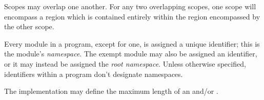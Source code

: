 \specsubitem
Scopes may overlap one another. For any two overlapping scopes, one scope will
encompass a region which is contained entirely within the region encompassed by
the other scope.

\specsubitem
Every module in a program, except for one, is assigned a unique identifier; this
is the module's \textit{namespace}. The exempt module may also be assigned an
identifier, or it may instead be assigned the \textit{root namespace}. Unless
otherwise specified, identifiers within a program don't designate namespaces.

\specsubitem
The implementation may define the maximum length of an 
and/or .
